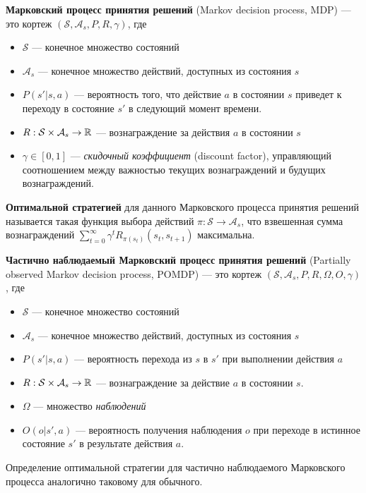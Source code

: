 \documentclass[]{itmo-student-thesis}
\begin{document}
\textbf{Марковский процесс принятия решений} (Markov decision process, MDP) ---
это кортеж
$(\mathcal{S}, \mathcal{A}_s, P, R, \gamma)$, где

\begin{itemize}
\item $\mathcal{S}$ --- конечное множество состояний
\item $\mathcal{A}_s$ --- конечное множество действий, доступных из состояния
  $s$
\item $P(s' | s, a)$ --- вероятность того, что действие $a$ в состоянии $s$
  приведет к переходу в состояние $s'$ в следующий момент времени.
\item $R : \mathcal{S} \times \mathcal{A}_s \rightarrow \Bbb{R}$ ---
  вознаграждение за действия $a$ в состоянии $s$
\item $\gamma \in [0, 1]$ --- \textit{скидочный коэффициент} (discount factor),
  управляющий соотношением между важностью текущих вознаграждений и будущих вознаграждений.
\end{itemize}

\textbf{Оптимальной стратегией} для данного Марковского процесса принятия
решений называется такая функция выбора действий $\pi : \mathcal{S} \rightarrow \mathcal{A}_s$,
что взвешенная сумма вознаграждений $\sum\limits_{t=0}^{\infty} {\gamma^t
  R_{\pi(s_t)}(s_t, s_{t+1})}$ максимальна.

\textbf{Частично наблюдаемый Марковский процесс принятия решений} (Partially
observed Markov decision process, POMDP) --- это кортеж
$(\mathcal{S}, \mathcal{A}_s, P, R, \Omega, O, \gamma)$, где
\begin{itemize}
\item $\mathcal{S}$ --- конечное множество состояний
\item $\mathcal{A}_s$ --- конечное множество действий, доступных из состояния $s$
\item $P(s' | s, a)$ --- вероятность перехода из $s$ в $s'$ при выполнении
  действия $a$
\item $R : \mathcal{S} \times \mathcal{A}_s \rightarrow \Bbb{R}$ ---
  вознаграждение за действие $a$ в состоянии $s$.
\item $\Omega$ --- множество \textit{наблюдений}
\item $O(o | s', a)$ --- вероятность получения наблюдения $o$ при переходе в
  истинное состояние $s'$ в результате действия $a$. 
\end{itemize}

Определение оптимальной стратегии для частично наблюдаемого Марковского процесса
аналогично таковому для обычного.
\end{document}
